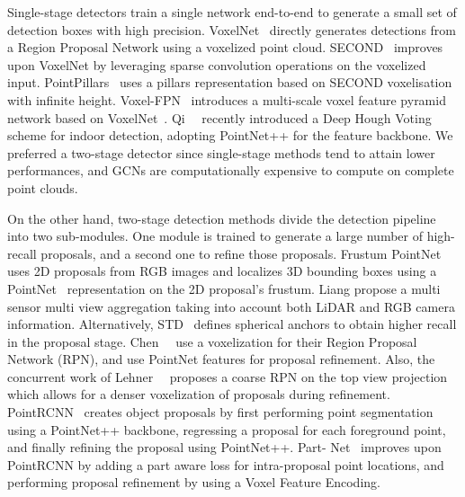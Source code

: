 \documentclass[10pt,twocolumn,letterpaper]{article}
\begin{document}
Single-stage detectors train a single network end-to-end to generate a small set of detection boxes with high precision.
VoxelNet~\cite{zhou2018voxelnet} directly generates detections from a Region Proposal Network using a voxelized point cloud.
SECOND~\cite{yan2018second} improves upon VoxelNet by leveraging sparse convolution operations on the voxelized input.
PointPillars~\cite{lang2019pointpillars} uses a pillars representation based on SECOND voxelisation with infinite height.
Voxel-FPN~\cite{wang2019voxel} introduces a multi-scale voxel feature pyramid network based on VoxelNet~\cite{zhou2018voxelnet}. 
Qi~\etal~\cite{Qi_2019_ICCV} recently introduced a Deep Hough Voting scheme for indoor detection, adopting PointNet++\cite{qi2017pointnet++} for the feature backbone.
We preferred a two-stage detector since single-stage methods tend to attain lower performances, and GCNs are computationally expensive to compute on complete point clouds.






On the other hand, two-stage detection methods divide the detection pipeline into two sub-modules.
One module is trained to generate a large number of high-recall proposals, and a second one to refine those proposals.
Frustum PointNet~\cite{qi2018frustum} uses 2D proposals from RGB images and localizes 3D bounding boxes using a PointNet~\cite{qi2017pointnet} representation on the 2D proposal's frustum.
Liang \cite{liang2019multi} propose a multi sensor multi view aggregation taking into account both LiDAR and RGB camera information.
Alternatively, STD~\cite{Yang2019std} defines spherical anchors to obtain higher recall in the proposal stage.
Chen~\etal~\cite{Chen2019FastPointRCNN} use a voxelization for their Region Proposal Network (RPN), and use PointNet features for proposal refinement.
Also, the concurrent work of Lehner~\etal~\cite{lehner2019patch} proposes a coarse RPN on the top view projection which allows for a denser voxelization of proposals during refinement.
PointRCNN~\cite{shi2019pointrcnn} creates object proposals by first performing point segmentation using a PointNet++ backbone, regressing a proposal for each foreground point, and finally refining the proposal using PointNet++. 
Part- Net~\cite{shi2019part} improves upon PointRCNN by adding a part aware loss for intra-proposal point locations, and performing proposal refinement by using a Voxel Feature Encoding.
\end{document}
